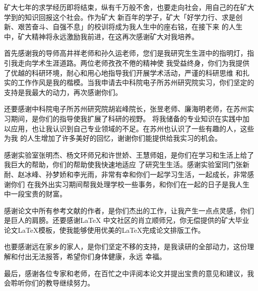 \documentclass[final,MD,numbers,times]{cumtthesis}
\begin{document}
\begin{acknowledgements}
矿大七年的求学经历即将结束，纵有千万般不舍，也要走向社会，用自己的在矿大学到的知识回报这个社会。作为矿大
新百年的学子，矿大「好学力行、求是创新、艰苦奋斗、自强不息」的校训将成为我人生中的座右铭，在接下来
的人生中，矿大精神将永远激励我前进，在这再次感谢矿大对我培养。

首先感谢我的导师高井祥老师和孙久运老师，您们是我研究生生涯中的指明灯，指引我走向学术生涯道路。两位老师孜孜不倦的精神使
我受益终身，你们为我提供了优越的科研环境，耐心和用心地指导我们开展学术活动，严谨的科研思维
和扎实的工作作风是我的楷模。当我申请去中科院电子所苏州研究院实习，你们坚定的支持是我最大的动力，再次感谢你们。

还要感谢中科院电子所苏州研究院胡岩峰院长，张昱老师、廉海明老师，在苏州实习期间，是你们的指导使我扩展了科研的视野。
将我储备的专业知识在实践中加以应用，也让我认识到自己专业领域的不足。在苏州也认识了一些有趣的人，这些为我
的人生增加了许多美好的回忆，谢谢你们能提供给我实习的机会。

感谢实验室张明杰、杨文环师兄和许世娇、王慧师姐，是你们在学习和生活上给了我巨大的帮助，你们的帮助使我快速地适应
了研究生生活。感谢实验室同门张新耐、赵冰峰、孙梦娇和李光雨，非常有幸和你们一起学习生活，一起成长，非常感谢你们
在我外出实习期间帮我处理学校一些事务，和你们在一起的日子是我人生中一段宝贵的财富。

感谢论文中所有参考文献的作者，是你们杰出的工作，让我产生一点点灵感，你们是巨人的肩膀。还要感谢\LaTeX
中文社区的肖立顺师兄，你无偿提供的矿大毕业论文\LaTeX{}模板，使我能够使用优美的\LaTeX{}完成论文排版工作。

也要感谢远在家乡的家人，是你们坚定不移的支持，是我读研的全部动力，这份理解和付出无法报答，希望你们身体健康，永远
幸福。

最后，感谢各位专家和老师，在百忙之中评阅本论文并提出宝贵的意见和建议，我会聆听你们的教导继续努力。
\end{acknowledgements}
\end{document}
